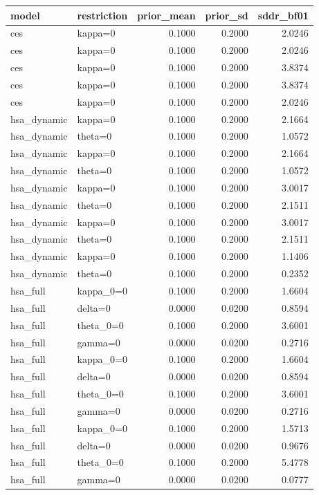 \begin{tabular}{llrrr}
\toprule
model & restriction & prior\_mean & prior\_sd & sddr\_bf01 \\
\midrule
ces & kappa=0 & 0.1000 & 0.2000 & 2.0246 \\
ces & kappa=0 & 0.1000 & 0.2000 & 2.0246 \\
ces & kappa=0 & 0.1000 & 0.2000 & 3.8374 \\
ces & kappa=0 & 0.1000 & 0.2000 & 3.8374 \\
ces & kappa=0 & 0.1000 & 0.2000 & 2.0246 \\
hsa\_dynamic & kappa=0 & 0.1000 & 0.2000 & 2.1664 \\
hsa\_dynamic & theta=0 & 0.1000 & 0.2000 & 1.0572 \\
hsa\_dynamic & kappa=0 & 0.1000 & 0.2000 & 2.1664 \\
hsa\_dynamic & theta=0 & 0.1000 & 0.2000 & 1.0572 \\
hsa\_dynamic & kappa=0 & 0.1000 & 0.2000 & 3.0017 \\
hsa\_dynamic & theta=0 & 0.1000 & 0.2000 & 2.1511 \\
hsa\_dynamic & kappa=0 & 0.1000 & 0.2000 & 3.0017 \\
hsa\_dynamic & theta=0 & 0.1000 & 0.2000 & 2.1511 \\
hsa\_dynamic & kappa=0 & 0.1000 & 0.2000 & 1.1406 \\
hsa\_dynamic & theta=0 & 0.1000 & 0.2000 & 0.2352 \\
hsa\_full & kappa\_0=0 & 0.1000 & 0.2000 & 1.6604 \\
hsa\_full & delta=0 & 0.0000 & 0.0200 & 0.8594 \\
hsa\_full & theta\_0=0 & 0.1000 & 0.2000 & 3.6001 \\
hsa\_full & gamma=0 & 0.0000 & 0.0200 & 0.2716 \\
hsa\_full & kappa\_0=0 & 0.1000 & 0.2000 & 1.6604 \\
hsa\_full & delta=0 & 0.0000 & 0.0200 & 0.8594 \\
hsa\_full & theta\_0=0 & 0.1000 & 0.2000 & 3.6001 \\
hsa\_full & gamma=0 & 0.0000 & 0.0200 & 0.2716 \\
hsa\_full & kappa\_0=0 & 0.1000 & 0.2000 & 1.5713 \\
hsa\_full & delta=0 & 0.0000 & 0.0200 & 0.9676 \\
hsa\_full & theta\_0=0 & 0.1000 & 0.2000 & 5.4778 \\
hsa\_full & gamma=0 & 0.0000 & 0.0200 & 0.0777 \\

\end{tabular}
